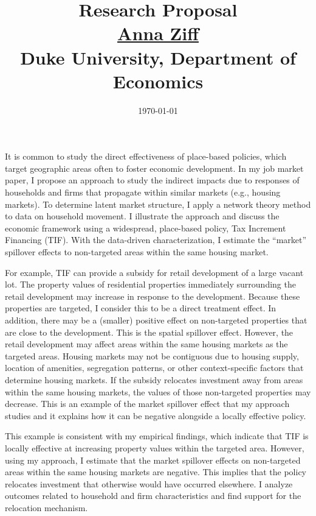 

\setlength{\parskip}{\baselineskip}%
\setlength{\parindent}{0pt}%
\setlength{\droptitle}{-5em}



\title{\normalsize \textbf{Research Proposal} \\ \href{https://aziff.github.io}{Anna Ziff} \\ Duke University, Department of Economics}
\date{\vspace{-2.25cm} \normalsize \today }
\maketitle


It is common to study the direct effectiveness of place-based policies, which target geographic areas often to foster economic development. In my job market paper, I propose an approach to study the indirect impacts due to responses of households and firms that propagate within similar markets (e.g., housing markets). To determine latent market structure, I apply a network theory method to data on household movement. I illustrate the approach and discuss the economic framework using a widespread, place-based policy, Tax Increment Financing (TIF). With the data-driven characterization, I estimate the ``market'' spillover effects to non-targeted areas within the same housing market. 

For example, TIF can provide a subsidy for retail development of a large vacant lot. The property values of residential properties immediately surrounding the retail development may increase in response to the development. Because these properties are targeted, I consider this to be a direct treatment effect. In addition, there may be a (smaller) positive effect on non-targeted properties that are close to the development. This is the spatial spillover effect. However, the retail development may affect areas within the same housing markets as the targeted areas. Housing markets may not be contiguous due to housing supply, location of amenities, segregation patterns, or other context-specific factors that determine housing markets. If the subsidy relocates investment away from areas within the same housing markets, the values of those non-targeted properties may decrease. This is an example of the market spillover effect that my approach studies and it explains how it can be negative alongside a locally effective policy.

This example is consistent with my empirical findings, which indicate that TIF is locally effective at increasing property values within the targeted area. However, using my approach, I estimate that the market spillover effects on non-targeted areas within the same housing markets are negative. This implies that the policy relocates investment that otherwise would have occurred elsewhere. I analyze outcomes related to household and firm characteristics and find support for the relocation mechanism. 

